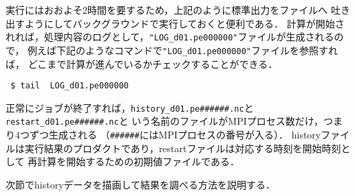実行にはおおよそ2時間を要するため，上記のように標準出力をファイルへ
吐き出すようにしてバックグラウンドで実行しておくと便利である．
計算が開始されれば，処理内容のログとして，\verb|"LOG_d01.pe000000"|ファイルが生成されるので，
例えば下記のようなコマンドで\verb|"LOG_d01.pe000000"|ファイルを参照すれば，
どこまで計算が進んでいるかチェックすることができる．
\begin{verbatim}
 $ tail  LOG_d01.pe000000
\end{verbatim}
正常にジョブが終了すれば，\verb|history_d01.pe######.nc|と\verb|restart_d01.pe######.nc|と
いう名前のファイルがMPIプロセス数だけ，つまり4つずつ生成される
（\verb|######|にはMPIプロセスの番号が入る）．
historyファイルは実行結果のプロダクトであり，restartファイルは対応する時刻を開始時刻として
再計算を開始するための初期値ファイルである．

次節でhistoryデータを描画して結果を調べる方法を説明する．


